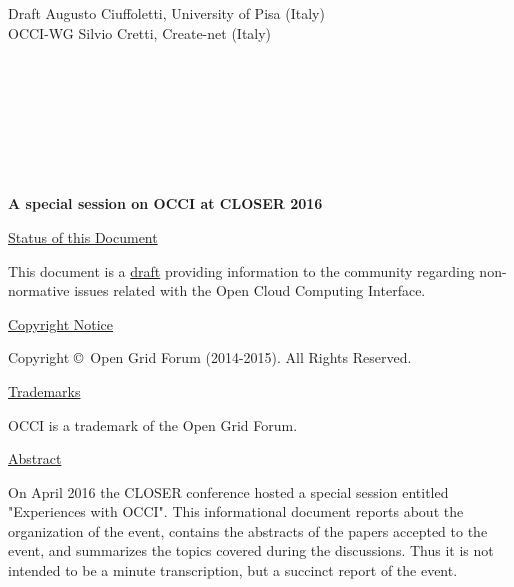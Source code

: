 \documentclass[10pt,a4paper]{article}
\begin{document}
	
	\thispagestyle{empty}
	
	Draft \hfill Augusto Ciuffoletti, University of Pisa (Italy)\\
	OCCI-WG  \hfill Silvio Cretti, Create-net (Italy)\\
	\\
	\\
	\\
	\\
	\\
	\\
	\\
	\rightline {\today}
	
	\vspace*{0.5in}
	
	\begin{Large}
		\textbf{A special session on OCCI at CLOSER 2016}
	\end{Large}
	
	\vspace*{0.5in}
	
	\underline{Status of this Document}
	
	
	This document is a \underline{draft} providing information to the community regarding non-normative issues related with the Open Cloud Computing Interface.
	
	\underline{Copyright Notice}
	
	Copyright \copyright ~Open Grid Forum (2014-2015). All Rights
	Reserved.
	
	\underline{Trademarks}
	
	OCCI is a trademark of the Open Grid Forum.
	
	\underline{Abstract}
	
%	
	On April 2016 the CLOSER conference hosted a special session entitled "Experiences with OCCI". This informational document reports about the organization of the event, contains the abstracts of the papers accepted to the event, and summarizes the topics covered during the discussions. Thus it is not intended to be a minute transcription, but a succinct report of the event. 
	
	\newpage
	\tableofcontents
	\newpage
\end{document}
